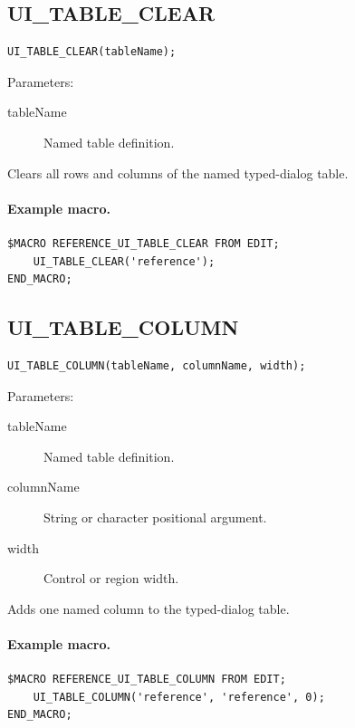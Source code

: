 \documentclass[a4paper,10pt,twoside,openany]{book}
\newenvironment{mrmacextension}{\begin{changebar}}{\end{changebar}}
\begin{document}
\begin{mrmacextension}
\label{prim:procedure-ui-table-clear}
\subsection*{UI\_TABLE\_CLEAR}
\begin{verbatim}
UI_TABLE_CLEAR(tableName);
\end{verbatim}
Parameters:
\begin{description}
\item[tableName] Named table definition.
\end{description}

Clears all rows and columns of the named typed-dialog table.

\paragraph{Example macro.}
\begin{verbatim}
$MACRO REFERENCE_UI_TABLE_CLEAR FROM EDIT;
    UI_TABLE_CLEAR('reference');
END_MACRO;
\end{verbatim}
\end{mrmacextension}

\begin{mrmacextension}
\label{prim:procedure-ui-table-column}
\subsection*{UI\_TABLE\_COLUMN}
\begin{verbatim}
UI_TABLE_COLUMN(tableName, columnName, width);
\end{verbatim}
Parameters:
\begin{description}
\item[tableName] Named table definition.
\item[columnName] String or character positional argument.
\item[width] Control or region width.
\end{description}

Adds one named column to the typed-dialog table.

\paragraph{Example macro.}
\begin{verbatim}
$MACRO REFERENCE_UI_TABLE_COLUMN FROM EDIT;
    UI_TABLE_COLUMN('reference', 'reference', 0);
END_MACRO;
\end{verbatim}
\end{mrmacextension}
\end{document}
